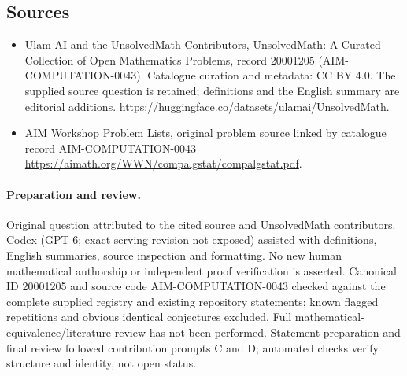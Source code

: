 \documentclass[11pt]{article}
\begin{document}
\subsection{Sources}
\begin{itemize}
\item[\hypertarget{source:20001205:1}{S1}] Ulam AI and the UnsolvedMath Contributors, UnsolvedMath: A Curated Collection of Open Mathematics Problems, record 20001205 (AIM-COMPUTATION-0043). Catalogue curation and metadata: CC BY 4.0. The supplied source question is retained; definitions and the English summary are editorial additions.
\url{https://huggingface.co/datasets/ulamai/UnsolvedMath}.
\item[\hypertarget{source:20001205:2}{S2}] AIM Workshop Problem Lists, original problem source linked by catalogue record AIM-COMPUTATION-0043
\url{https://aimath.org/WWN/compalgstat/compalgstat.pdf}.
\end{itemize}
\paragraph{Preparation and review.}
Original question attributed to the cited source and UnsolvedMath contributors. Codex (GPT-6; exact serving revision not exposed) assisted with definitions, English summaries, source inspection and formatting. No new human mathematical authorship or independent proof verification is asserted. Canonical ID 20001205 and source code AIM-COMPUTATION-0043 checked against the complete supplied registry and existing repository statements; known flagged repetitions and obvious identical conjectures excluded. Full mathematical-equivalence/literature review has not been performed. Statement preparation and final review followed contribution prompts C and D; automated checks verify structure and identity, not open status.
\label{end:20001205}
\end{document}

